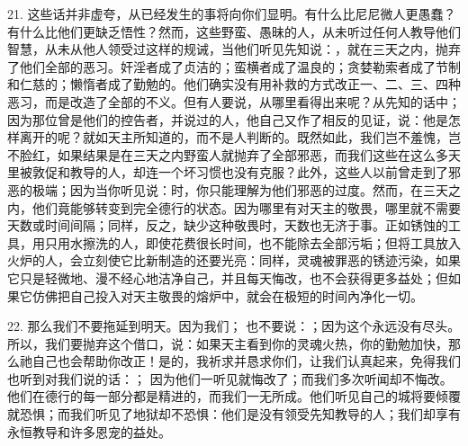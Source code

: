 21. 这些话并非虚夸，从已经发生的事将向你们显明。有什么比尼尼微人更愚蠢？有什么比他们更缺乏悟性？然而，这些野蛮、愚昧的人，从未听过任何人教导他们智慧，从未从他人领受过这样的规诫，当他们听见先知说：，就在三天之内，抛弃了他们全部的恶习。奸淫者成了贞洁的；蛮横者成了温良的；贪婪勒索者成了节制和仁慈的；懒惰者成了勤勉的。他们确实没有用补救的方式改正一、二、三、四种恶习，而是改造了全部的不义。但有人要说，从哪里看得出来呢？从先知的话中；因为那位曾是他们的控告者，并说过的人，他自己又作了相反的见证，说：他是怎样离开的呢？就如天主所知道的，而不是人判断的。既然如此，我们岂不羞愧，岂不脸红，如果结果是在三天之内野蛮人就抛弃了全部邪恶，而我们这些在这么多天里被敦促和教导的人，却连一个坏习惯也没有克服？此外，这些人以前曾走到了邪恶的极端；因为当你听见说：时，你只能理解为他们邪恶的过度。然而，在三天之内，他们竟能够转变到完全德行的状态。因为哪里有对天主的敬畏，哪里就不需要天数或时间间隔；同样，反之，缺少这种敬畏时，天数也无济于事。正如锈蚀的工具，用只用水擦洗的人，即使花费很长时间，也不能除去全部污垢；但将工具放入火炉的人，会立刻使它比新制造的还要光亮：同样，灵魂被罪恶的锈迹污染，如果它只是轻微地、漫不经心地洁净自己，并且每天悔改，也不会获得更多益处；但如果它仿佛把自己投入对天主敬畏的熔炉中，就会在极短的时间內净化一切。\par

22. 那么我们不要拖延到明天。因为我们； 也不要说：；因为这个永远没有尽头。所以，我们要抛弃这个借口，说：如果天主看到你的灵魂火热，你的勤勉加快，那么祂自己也会帮助你改正！是的，我祈求并恳求你们，让我们认真起来，免得我们也听到对我们说的话：； 因为他们一听见就悔改了；而我们多次听闻却不悔改。他们在德行的每一部分都是精进的，而我们一无所成。他们听见自己的城将要倾覆就恐惧；而我们听见了地狱却不恐惧：他们是没有领受先知教导的人；我们却享有永恒教导和许多恩宠的益处。\par

